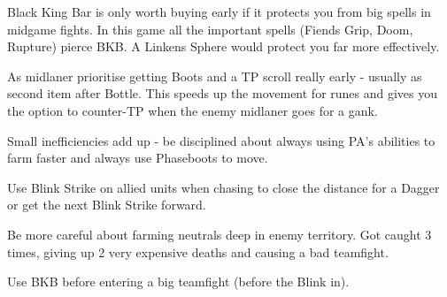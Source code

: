 {
\item Black King Bar is only worth buying early if it protects you from big spells in midgame fights. In this game all the important spells (Fiends Grip, Doom, Rupture) pierce BKB. A Linkens Sphere would protect you far more effectively.
\item As midlaner prioritise getting Boots and a TP scroll really early - usually as second item after Bottle. This speeds up the movement for runes and gives you the option to counter-TP when the enemy midlaner goes for a gank.
\item Small inefficiencies add up - be disciplined about always using PA's abilities to farm faster and always use Phaseboots to move.
\item Use Blink Strike on allied units when chasing to close the distance for a Dagger or get the next Blink Strike forward.
\item Be more careful about farming neutrals deep in enemy territory. Got caught 3 times, giving up 2 very expensive deaths and causing a bad teamfight.
\item Use BKB before entering a big teamfight (before the Blink in).
}


